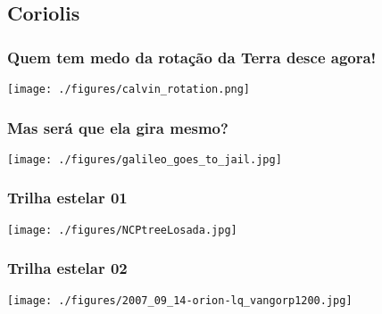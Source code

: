 \subsection{Coriolis}
\begin{frame}
  \frametitle{Quem tem medo da rotação da Terra desce agora!}
  \begin{center}
    \texttt{[image: ./figures/calvin\_rotation.png]}
  \end{center}
\end{frame}


\begin{frame}
  \frametitle{Mas será que ela gira mesmo?}
  \begin{center}
    \texttt{[image: ./figures/galileo\_goes\_to\_jail.jpg]}
  \end{center}
\end{frame}

\begin{frame}
  \frametitle{Trilha estelar 01}
  \begin{center}
    \texttt{[image: ./figures/NCPtreeLosada.jpg]}
  \end{center}
\end{frame}


\begin{frame}
  \frametitle{Trilha estelar 02}
  \begin{center}
    \texttt{[image: ./figures/2007\_09\_14-orion-lq\_vangorp1200.jpg]}
  \end{center}
\end{frame}


